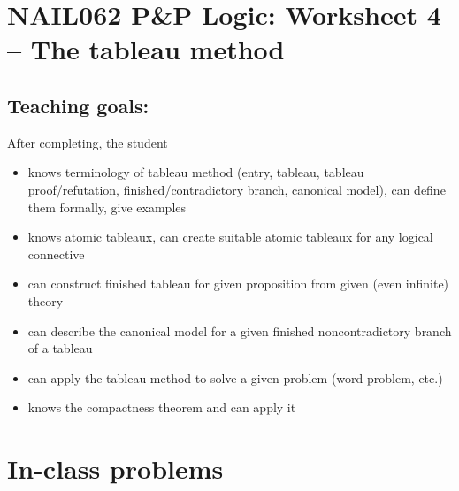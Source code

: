 \section*{NAIL062 P\&P Logic: Worksheet 4 -- The tableau method}



\subsection*{Teaching goals:} After completing, the student

    \begin{itemize}\setlength{\itemsep}{0pt}
        \item knows terminology of tableau method (entry, tableau, tableau proof/refutation, finished/contradictory branch, canonical model), can define them formally, give examples
        \item knows atomic tableaux, can create suitable atomic tableaux for any logical connective
        \item can construct finished tableau for given proposition from given (even infinite) theory
        \item can describe the canonical model for a given finished noncontradictory branch of a tableau
        \item can apply the tableau method to solve a given problem (word problem, etc.)
        \item knows the compactness theorem and can apply it
    \end{itemize}

    

\section*{In-class problems}


